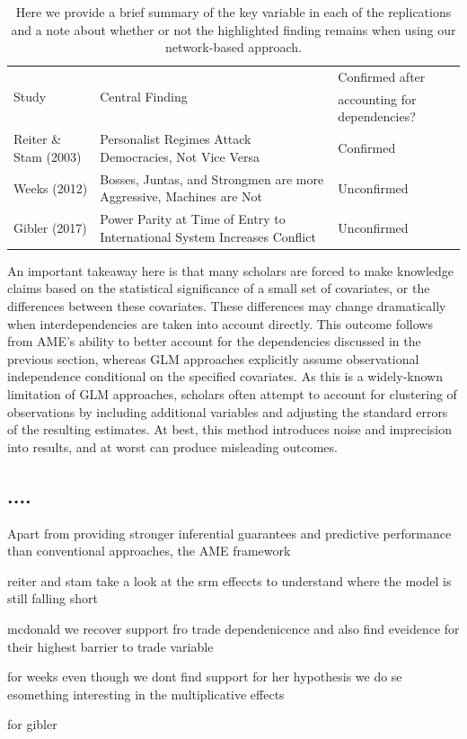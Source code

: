 \begin{table}[ht]
\centering
\caption{Here we provide a brief summary of the key variable in each of the replications and a note about whether or not the highlighted finding remains when using our network-based approach.}
	\begin{tabular}{l p{7cm} l} \toprule
		\multirow{2}{*}{Study} & \multirow{2}{*}{Central Finding} &  Confirmed after \\
		& &  accounting for dependencies? \\ \toprule
		Reiter \& Stam (2003) & Personalist Regimes Attack Democracies, Not Vice Versa & {Confirmed} \\ \midrule
		Weeks (2012) & Bosses, Juntas, and Strongmen are more Aggressive, Machines are Not & {Unconfirmed} \\\midrule
		Gibler (2017) & Power Parity at Time of Entry to International System Increases Conflict & {Unconfirmed}\\ \bottomrule
	\end{tabular}
	\label{tab:modelFindingSumm}
\end{table}

An important takeaway here is that many scholars are forced to make knowledge claims based on the statistical significance of a small set of covariates, or the differences between these covariates. These differences may change dramatically when interdependencies are taken into account directly. This outcome follows from AME's ability to better account for the dependencies discussed in the previous section, whereas GLM approaches explicitly assume observational independence conditional on the specified covariates. As this is a widely-known limitation of GLM approaches, scholars often attempt to account for clustering of observations by including additional variables and adjusting the standard errors of the resulting estimates. At best, this method introduces noise and imprecision into results, and at worst can produce misleading outcomes. 

\subsection{....}

Apart from providing stronger inferential guarantees and predictive performance than conventional approaches, the AME framework 


reiter and stam take a look at the srm effeccts to understand where the model is still falling short

mcdonald we recover support fro trade dependenicence and also find eveidence for their highest barrier to trade variable

for weeks even though we dont find support for her hypothesis we do se esomething interesting in the multiplicative effects

for gibler 

